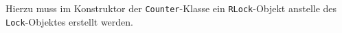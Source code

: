 Hierzu muss im Konstruktor der \lstinline$Counter$-Klasse ein \lstinline$RLock$-Objekt
anstelle des \lstinline$Lock$-Objektes erstellt werden.